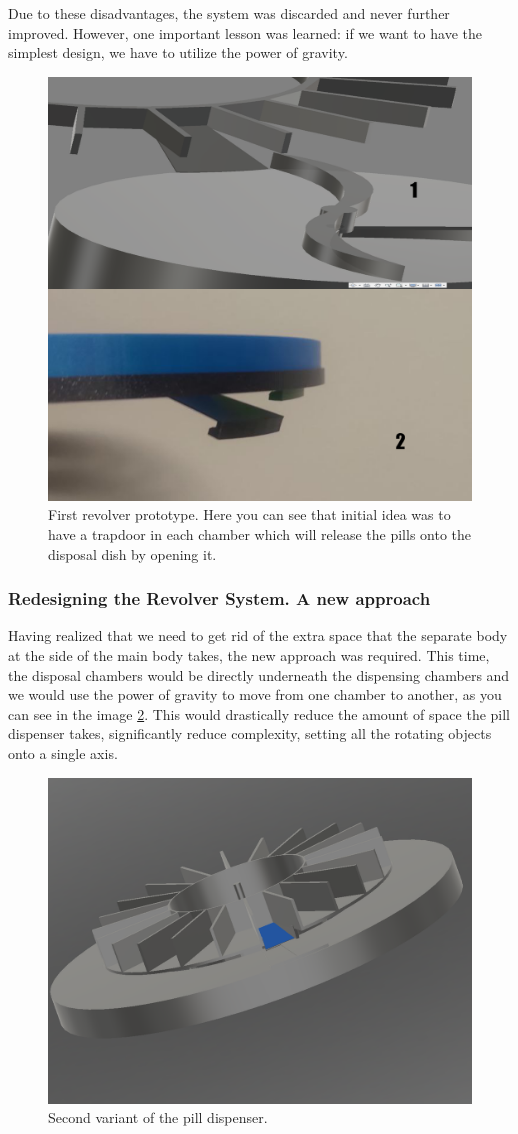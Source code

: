Due to these disadvantages, the system was discarded and never further improved. However, one important lesson was learned: if we want to have the simplest design, we have to utilize the power of gravity.
\begin{figure}[h]
	\centering
	\includegraphics[width=0.7\linewidth]{Figures/Untitled-2}
	\caption[First revolver prototype]{First revolver prototype. Here you can see that initial idea was to have a trapdoor in each chamber which will release the pills onto the disposal dish by opening it.}
	\label{fig:screenshot1}
\end{figure}
\newpage
\subsubsection{Redesigning the Revolver System. A new approach}
Having realized that we need to get rid of the extra space that the separate body at the side of the main body takes, the new approach was required. This time, the disposal chambers would be directly underneath the dispensing chambers and we would use the power of gravity to move from one chamber to another, as you can see in the image \ref{fig:pspd2}. This would drastically reduce the amount of space the pill dispenser takes, significantly reduce complexity, setting all the rotating objects onto a single axis.


\begin{figure}[h]
	\centering
	\includegraphics[width=0.7\linewidth]{Figures/PSPD2}
	\caption[2 Variant of the pill dispenser.]{Second variant of the pill dispenser.}
	\label{fig:pspd2}
\end{figure}

